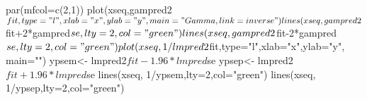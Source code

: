 \begin{Schunk}
\begin{Sinput}
 par(mfcol=c(2,1))
 plot(xseq,gampred2$fit,type="l",xlab="x",ylab="y", main="Gamma, link=inverse")
 lines(xseq, gampred2$fit+2*gampred$se,lty=2,col="green")
 lines(xseq, gampred2$fit-2*gampred$se,lty=2,col="green")
 plot(xseq,1/lmpred2$fit,type="l",xlab="x",ylab="y", main="")
 ypsem<- lmpred2$fit-1.96*lmpred$se
 ypsep<- lmpred2$fit+1.96*lmpred$se
 lines(xseq, 1/ypsem,lty=2,col="green")
 lines(xseq, 1/ypsep,lty=2,col="green")
 
\end{Sinput}
\end{Schunk}
